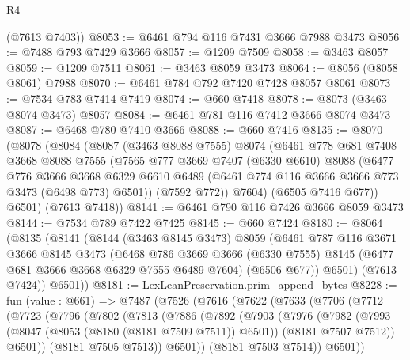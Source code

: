 \begin{lexlean}{R4}
\begin{coremodule}
      (@7613 @7403))
@8053 := @6461 @794 @116 @7431 @3666 @7988 @3473
@8056 := @7488 @793 @7429 @3666
@8057 := @1209 @7509
@8058 := @3463 @8057
@8059 := @1209 @7511
@8061 := @3463 @8059 @3473
@8064 := @8056 (@8058 @8061) @7988
@8070 := @6461 @784 @792 @7420 @7428 @8057 @8061
@8073 := @7534 @783 @7414 @7419
@8074 := @660 @7418
@8078 := @8073 (@3463 @8074 @3473) @8057
@8084 := @6461 @781 @116 @7412 @3666 @8074 @3473
@8087 := @6468 @780 @7410 @3666
@8088 := @660 @7416
@8135 := @8070
    (@8078
      (@8084
        (@8087
          (@3463 @8088 @7555)
          @8074
          (@6461
            @778
            @681
            @7408
            @3668
            @8088
            @7555
            (@7565
              @777
              @3669
              @7407
              (@6330 @6610)
              @8088
              (@6477
                @776
                @3666
                @3668
                @6329
                @6610
                @6489
                (@6461 @774 @116 @3666 @3666 @773 @3473 (@6498 @773) @6501))
              (@7592 @772))
            @7604)
          (@6505 @7416 @677))
        @6501)
      (@7613 @7418))
@8141 := @6461 @790 @116 @7426 @3666 @8059 @3473
@8144 := @7534 @789 @7422 @7425
@8145 := @660 @7424
@8180 := @8064
    (@8135
      (@8141
        (@8144
          (@3463 @8145 @3473)
          @8059
          (@6461
            @787
            @116
            @3671
            @3666
            @8145
            @3473
            (@6468
              @786
              @3669
              @3666
              (@6330 @7555)
              @8145
              (@6477 @681 @3666 @3668 @6329 @7555 @6489 @7604)
              (@6506 @677))
            @6501)
          (@7613 @7424))
        @6501))
@8181 := LexLeanPreservation.prim_append_bytes
@8228 := fun (value : @661) =>
  @7487
    (@7526
      (@7616
        (@7622
          (@7633
            (@7706
              (@7712
                (@7723
                  (@7796
                    (@7802
                      (@7813
                        (@7886
                          (@7892
                            (@7903
                              (@7976
                                (@7982
                                  (@7993
                                    (@8047 (@8053 (@8180 (@8181 @7509 @7511)) @6501))
                                    (@8181 @7507 @7512))
                                  @6501))
                              (@8181 @7505 @7513))
                            @6501))
                        (@8181 @7503 @7514))
                      @6501))

\end{coremodule}
\end{lexlean}
